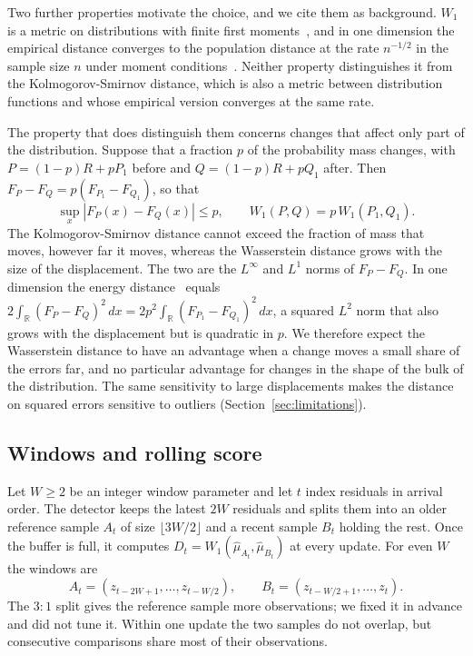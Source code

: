 \documentclass[preprint,12pt]{elsarticle}
\begin{document}
Two further properties motivate the choice, and we cite them as background. $W_1$ is a metric on distributions with finite first moments~\cite{villani2008}, and in one dimension the empirical distance converges to the population distance at the rate $n^{-1/2}$ in the sample size $n$ under moment conditions~\cite{bobkov2019one}. Neither property distinguishes it from the Kolmogorov-Smirnov distance, which is also a metric between distribution functions and whose empirical version converges at the same rate.

The property that does distinguish them concerns changes that affect only part of the distribution. Suppose that a fraction $p$ of the probability mass changes, with $P=(1-p)R+pP_1$ before and $Q=(1-p)R+pQ_1$ after. Then $F_P-F_Q=p(F_{P_1}-F_{Q_1})$, so that
\begin{equation}\label{eq:mass}
\sup_x|F_P(x)-F_Q(x)|\leq p,\qquad W_1(P,Q)=p\,W_1(P_1,Q_1).
\end{equation}
The Kolmogorov-Smirnov distance cannot exceed the fraction of mass that moves, however far it moves, whereas the Wasserstein distance grows with the size of the displacement. The two are the $L^\infty$ and $L^1$ norms of $F_P-F_Q$. In one dimension the energy distance~\cite{szekely2013energy} equals $2\int_{\mathbb R}(F_P-F_Q)^2\,dx=2p^2\int_{\mathbb R}(F_{P_1}-F_{Q_1})^2\,dx$, a squared $L^2$ norm that also grows with the displacement but is quadratic in $p$. We therefore expect the Wasserstein distance to have an advantage when a change moves a small share of the errors far, and no particular advantage for changes in the shape of the bulk of the distribution. The same sensitivity to large displacements makes the distance on squared errors sensitive to outliers (Section~\ref{sec:limitations}).

\subsection{Windows and rolling score}
Let $W\geq2$ be an integer window parameter and let $t$ index residuals in arrival order. The detector keeps the latest $2W$ residuals and splits them into an older reference sample $A_t$ of size $\lfloor3W/2\rfloor$ and a recent sample $B_t$ holding the rest. Once the buffer is full, it computes $D_t=W_1(\hat\mu_{A_t},\hat\mu_{B_t})$ at every update. For even $W$ the windows are
\begin{equation}
A_t=(z_{t-2W+1},\ldots,z_{t-W/2}),\qquad
B_t=(z_{t-W/2+1},\ldots,z_t).
\end{equation}
The $3:1$ split gives the reference sample more observations; we fixed it in advance and did not tune it. Within one update the two samples do not overlap, but consecutive comparisons share most of their observations.
\end{document}
